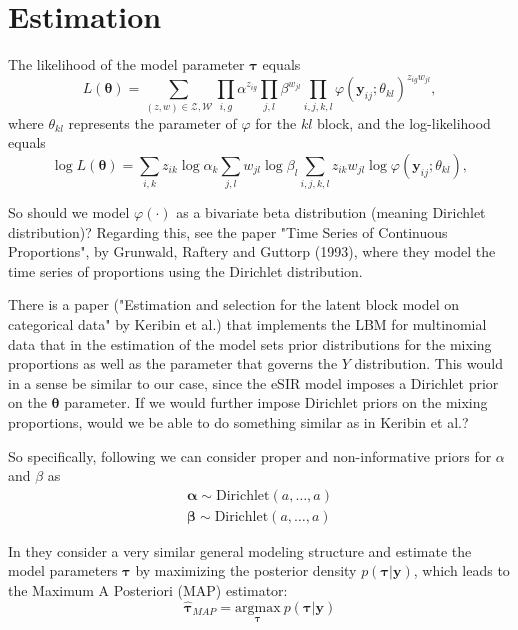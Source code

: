 \documentclass[10pt,a4paper]{article}
\begin{document}
\section{Estimation}

The likelihood of the model parameter $\boldsymbol{\tau}$ equals
$$
L(\boldsymbol{\theta}) = \sum_{(z, w) \in \mathcal{Z}, \mathcal{W}} \prod_{i, g} \alpha^{z_{ig}} \prod_{j, l} \beta^{w_{jl}} \prod_{i, j, k, l} \varphi(\mathbf{y}_{ij}; \theta_{kl})^{z_{ig} w_{jl}},
$$
%
where $\theta_{kl}$ represents the parameter of $\varphi$ for the $kl$ block, and the log-likelihood equals 
%
$$
\log L(\boldsymbol{\theta}) = \sum_{i, k} z_{ik} \log\alpha_k \sum_{j, l} w_{jl} \log \beta_l \sum_{i, j, k, l} z_{ik} w_{jl} \log\varphi(\mathbf{y}_{ij}; \theta_{kl}),
$$
%

So should we model $\varphi(\cdot)$ as a bivariate beta distribution (meaning Dirichlet distribution)? Regarding this, see the paper "Time Series of Continuous Proportions", by Grunwald, Raftery and Guttorp (1993), where they model the time series of proportions using the Dirichlet distribution.


There is a paper ("Estimation and selection for the latent block model on categorical data" by Keribin et al.) that implements the LBM for multinomial data that in the estimation of the model sets prior distributions for the mixing proportions as well as the parameter that governs the $Y$ distribution. This would in a sense be similar to our case, since the eSIR model imposes a Dirichlet prior on the $\boldsymbol{\theta}$ parameter. If we would further impose Dirichlet priors on the mixing proportions, would we be able to do something similar as in Keribin et al.?

So specifically, following \parencite{keribin2015estimation} we can consider proper and non-informative priors for $\alpha$ and $\beta$ as
%
\begin{equation}
	\begin{aligned}
		\boldsymbol{\alpha} \sim \text{Dirichlet}(a, \ldots, a) \\
		\boldsymbol{\beta} \sim \text{Dirichlet}(a, \ldots, a)
	\end{aligned}
\end{equation}
%

In \parencite{keribin2015estimation} they consider a very similar general modeling structure and estimate the model parameters $\boldsymbol{\tau}$ by maximizing the posterior density $p(\boldsymbol{\tau} | \boldsymbol{y})$, which leads to the Maximum A Posteriori (MAP) estimator: 
%
\begin{equation}
	\hat{\boldsymbol{\tau}}_{MAP} = \underset{\boldsymbol{\tau}}{\mathrm{argmax}} \: p(\boldsymbol{\tau} | \boldsymbol{y})
\end{equation}
 
\end{document}
